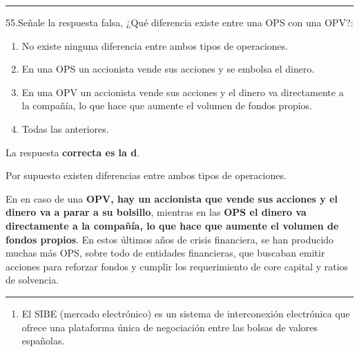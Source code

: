 \documentclass[
  letterpaper,
  DIV=11,
  numbers=noendperiod]{scrreprt}
\providecommand{\tightlist}{%
  \setlength{\itemsep}{0pt}\setlength{\parskip}{0pt}}\usepackage{longtable,booktabs,array}
\begin{document}
\begin{center}\rule{0.5\linewidth}{0.5pt}\end{center}

55.Señale la respuesta falsa, ¿Qué diferencia existe entre una OPS con
una OPV?:

\begin{enumerate}
\def\labelenumi{\alph{enumi})}
\item
  No existe ninguna diferencia entre ambos tipos de operaciones.
\item
  En una OPS un accionista vende sus acciones y se embolsa el dinero.
\item
  En una OPV un accionista vende sus acciones y el dinero va
  directamente a la compañía, lo que hace que aumente el volumen de
  fondos propios.
\item
  Todas las anteriores.
\end{enumerate}

\begin{tcolorbox}[enhanced jigsaw, left=2mm, opacityback=0, colback=white, breakable, arc=.35mm, bottomrule=.15mm, rightrule=.15mm, toprule=.15mm, leftrule=.75mm, colframe=quarto-callout-tip-color-frame]
\begin{minipage}[t]{5.5mm}
\textcolor{quarto-callout-tip-color}{\faLightbulb}
\end{minipage}%
\begin{minipage}[t]{\textwidth - 5.5mm}

La respuesta \textbf{correcta es la d}.

Por supuesto existen diferencias entre ambos tipos de operaciones.

En en caso de una \textbf{OPV, hay un accionista que vende sus acciones
y el dinero va a parar a su bolsillo}, mientras en las \textbf{OPS el
dinero va directamente a la compañía, lo que hace que aumente el volumen
de fondos propios}. En estos últimos años de crisis financiera, se han
producido muchas más OPS, sobre todo de entidades financieras, que
buscaban emitir acciones para reforzar fondos y cumplir los
requerimiento de core capital y ratios de solvencia.

\end{minipage}%
\end{tcolorbox}

\begin{center}\rule{0.5\linewidth}{0.5pt}\end{center}

\begin{enumerate}
\def\labelenumi{\arabic{enumi}.}
\setcounter{enumi}{55}
\tightlist
\item
  El SIBE (mercado electrónico) es un sistema de interconexión
  electrónica que ofrece una plataforma única de negociación entre las
  bolsas de valores españolas.
\end{enumerate}
\end{document}
